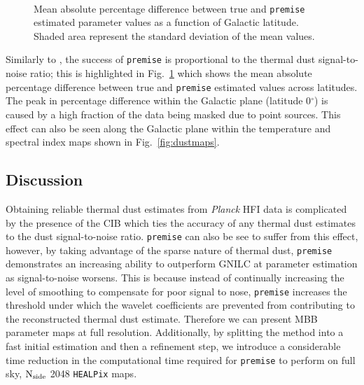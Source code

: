 \documentclass[a4paper,fleqn,usenatbib]{mnras}
\begin{document}
\begin{figure}
\centering
\,
\caption{Mean absolute percentage difference between true and {\texttt{premise}} estimated parameter values as a function of Galactic latitude. Shaded area represent the standard deviation of the mean values.}
\label{fig:lats}
\end{figure}

Similarly to \citet{gnilc}, the success of {\texttt{premise}} is proportional to the thermal dust signal-to-noise ratio; this is highlighted in Fig.~\ref{fig:lats} which shows the mean absolute percentage difference between true and {\texttt{premise}} estimated values across latitudes. The peak in percentage difference within the Galactic plane (latitude 0$^{\circ}$) is caused by a high fraction of the data being masked due to point sources. This effect can also be seen along the Galactic plane within the temperature and spectral index maps shown in Fig.~\ref{fig:dustmaps}.

\subsection{Discussion} 
 
Obtaining reliable thermal dust estimates from {\it{Planck}} HFI data is complicated by the presence of the CIB which ties the accuracy of any thermal dust estimates to the dust signal-to-noise ratio. {\texttt{premise}} can also be see to suffer from this effect, however, by taking advantage of the sparse nature of thermal dust, {\texttt{premise}} demonstrates an increasing ability to outperform GNILC at parameter estimation as signal-to-noise worsens. This is because instead of continually increasing the level of smoothing to compensate for poor signal to nose, {\texttt{premise}} increases the threshold under which the wavelet coefficients are prevented from contributing to the reconstructed thermal dust estimate. Therefore we can present MBB parameter maps at full resolution. Additionally, by splitting the method into a fast initial estimation and then a refinement step, we introduce a considerable time reduction in the computational time required for {\texttt{premise}} to perform on full sky, $\rm{N_{side}}$ 2048 {\texttt{HEALPix}} maps. 
\end{document}
